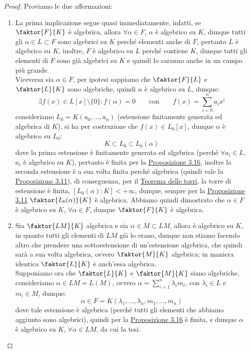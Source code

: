 \documentclass[11pt]{scrartcl}
\begin{document}
\begin{proof}
    Proviamo le due affermazioni:
    \begin{enumerate}[(1)]
        \item La prima implicazione segue quasi immediatamente, infatti, se $\faktor{F}{K}$ è algebrica, allora $\forall \alpha \in F$, $\alpha$ è algebrico su $K$,
            dunque tutti gli $\alpha \in L \subset F$ sono algebrici su $K$ perché elementi anche di $F$, pertanto $L$ è algebrico su $K$, inoltre, $F$ è algebrico su $L$ perché contiene $K$, dunque tutti gli elementi di $F$ sono già algebrici su $K$ e quindi lo saranno anche in un campo più grande.\\
            Viceversa sia $\alpha \in F$, per ipotesi sappiamo che $\faktor{F}{L}$ e $\faktor{L}{K}$ sono algebriche, quindi $\alpha$ è algebrico su $L$, dunque:
            \[ \exists f(x) \in L[x]\setminus\{0\} : f(\alpha) = 0 \qquad \text{con} \qquad f(x) = \sum_{i=0}^n a_ix^i
                \]
            consideriamo $L_0=K(a_0,\ldots,a_n)$ (estensione finitamente generata ed algebrica di $K$), si ha per costruzione che $f(x) \in L_0[x]$, dunque $\alpha$ è algebrico su $L_0$:
            \[ K \subset L_0 \subset L_0(\alpha)
                \]
            dove la prima estensione è finitamente generata ed algebrica (perché $\forall a_i \in L$, $a_i$ è algebrico su $K$), pertanto è finita per la \hyperref[3.16]{Proposizione 3.16}, inoltre la seconda 
            estensione è a sua volta finita perché algebrica (quindi vale la \hyperref[3.11]{Proposizione 3.11}), di conseguenza, per il \hyperref[torri]{Teorema delle torri}, la torre di estensione è finita,
            $[L_0(\alpha) : K] < +\infty$, dunque, sempre per la \hyperref[3.11]{Proposizione 3.11} $\faktor{L_0(\alpha)}{K}$ è algebrica. Abbiamo quindi dimostrato che $\alpha \in F$ è algebrico su $K$, $\forall \alpha \in F$,
            dunque $\faktor{F}{K}$ è algebrica.
         \item Sia $\faktor{LM}{K}$ algebrica e sia $\alpha \in M \subset LM$, allora è algebrico su $K$, in quanto tutti gli elementi di $LM$ già lo erano, dunque non stiamo facendo altro che prendere una sottoestensione di un'estensione algebrica, che quindi 
         sarà a sua volta algebrica, ovvero $\faktor{M}{K}$ algebrica; in maniera identica $\faktor{L}{K}$ è anch'essa algebrica.\\
         Supponiamo ora che $\faktor{L}{K}$ e $\faktor{M}{K}$ siano algebriche, consideriamo $\alpha \in LM = L(M)$, ovvero $\alpha = \sum_{i=1}^{n} \lambda_i m_i$, con $\lambda_i \in L$ e $m_i \in M$, dunque:
         \[ \alpha \in F = K(\lambda_1,\ldots,\lambda_n,m_1,\ldots,m_n)
            \]
        dove tale estensione è algebrica (perché tutti gli elementi che abbiamo aggiunto sono algebrici), quindi per la \hyperref[3.16]{Proposizione 3.16} è finita,
        e dunque $\alpha$ è algebrico su $K$, $\forall \alpha \in LM$, da cui la tesi.
    \end{enumerate}
\end{proof}
\end{document}

